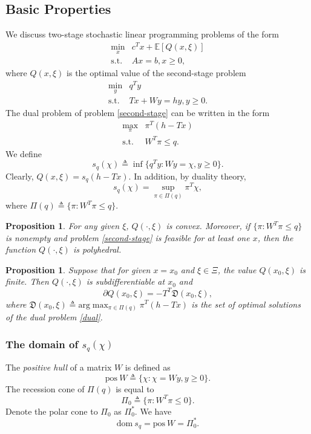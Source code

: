 \documentclass[a4pper,11pt]{article}
\newtheorem{prop}[thm]{Proposition}
\begin{document}
\subsection{Basic Properties}
We discuss two-stage stochastic linear programming problems of the form
\begin{equation}
\label{first}
\begin{array}{ll}
\min_{x} &c^Tx+\mathbb E[Q(x,\xi)]\\
\text{s.t.} &Ax=b, x\geq 0,
\end{array}
\end{equation}
where $Q(x,\xi)$ is the optimal value of the second-stage problem
\begin{equation}
\begin{array}{ll}
\min_y &q^Ty\\
\text{s.t.}& Tx+Wy=hy, y\geq 0.
\label{second-stage}
\end{array}
\end{equation}
The dual problem of problem \eqref{second-stage} can be written in the form
\begin{equation}
\begin{array}{ll}
\max_\pi &\pi^T(h-Tx)\\
\text{s.t.}& W^T\pi \leq q.
\label{dual}
\end{array}
\end{equation}
We define
$$
s_q(\chi)\triangleq \inf\{q^Ty: Wy=\chi,y\geq 0\}.
$$
Clearly, $Q(x,\xi)=s_q(h-Tx)$. In addition, by duality theory,
$$
s_q(\chi)=\sup_{\pi\in \Pi(q)}\pi^T\chi,
$$
where $\Pi(q)\triangleq\{\pi:W^T\pi\leq q\}$.
\begin{prop} For any given $\xi$, $Q(\cdot,\xi)$ is convex. Moreover, if $\{\pi:W^T\pi\leq q\}$ is nonempty and problem \eqref{second-stage} is feasible for at least one $x$, then the function $Q(\cdot,\xi)$ is polyhedral.
\label{prop-1}
\end{prop}
\begin{prop}
Suppose that for given $x=x_0$ and $\xi\in \Xi$, the value $Q(x_0,\xi)$ is finite. Then $Q(\cdot,\xi)$ is subdifferentiable at $x_0$ and
$$
\partial Q(x_0,\xi)=-T^T\mathfrak D(x_0,\xi),
$$
where $\mathfrak D(x_0,\xi)\triangleq \text{arg}\max_{\pi\in \Pi(q)}\pi^T(h-Tx)$ is the set of optimal solutions of the dual problem \eqref{dual}.
\end{prop}
\subsubsection{The domain of $s_q(\chi)$}
The \textit {positive hull} of a matrix $W$ is defined as 
$$\text{pos} \ W\triangleq \{\chi:\chi=Wy, y\geq0\}.$$
The recession cone of $\Pi(q)$ is equal to 
$$\Pi_0\triangleq \{\pi:W^T\pi\leq 0\}.$$
Denote the polar cone to $\Pi_0$ as $\Pi_0^*$.
We have
$$\text{dom} \ s_q=\text{pos}\ W=\Pi_0^*.$$
\end{document}
